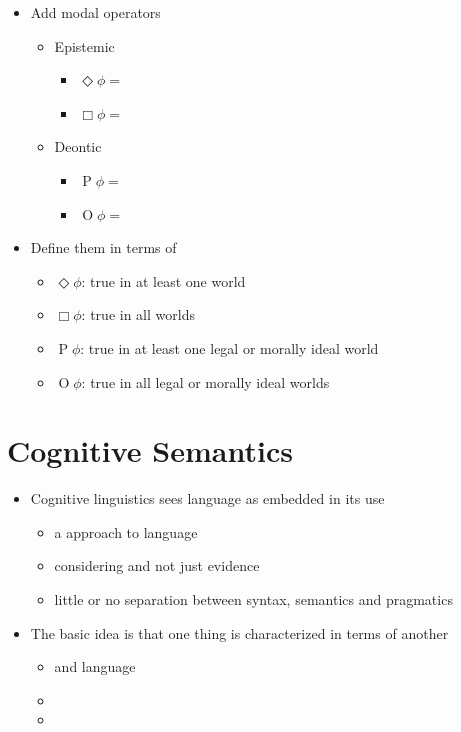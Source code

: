 \documentclass[headrule,footrule]{foils}
\begin{document}

\begin{itemize}
\item Add modal operators
  \begin{itemize}
  \item Epistemic
    \begin{itemize}
    \item $\operatorname\Diamond\phi =$ 
    \item $\operatorname\Box\phi =$ 
    \end{itemize}
  \item Deontic
    \begin{itemize}
    \item $\operatorname{P}\phi =$ 
    \item $\operatorname{O}\phi =$ 
    \end{itemize}
  \end{itemize}
\item Define them in terms of 
  \begin{itemize}
  \item $\operatorname{\Diamond}\phi$: true in at least one world
  \item $\operatorname{\Box}\phi$: true in all worlds
  \item $\operatorname{P}\phi$: true in at least one legal or morally ideal world
  \item $\operatorname{O}\phi$: true in all legal or morally ideal worlds
  \end{itemize}
\end{itemize}

\section{Cognitive Semantics}


\begin{itemize}
\item Cognitive linguistics sees language as embedded in its use
  \begin{itemize}
  \item a  approach to language
  \item considering  and not just  evidence
  \item little or no separation between syntax, semantics and pragmatics
  \end{itemize}
\item The basic idea is that one thing is characterized in terms of another
  \begin{itemize}
  \item {} and  language
  \item {}
  \item {}
  \end{itemize}
\end{itemize}
\end{document}
